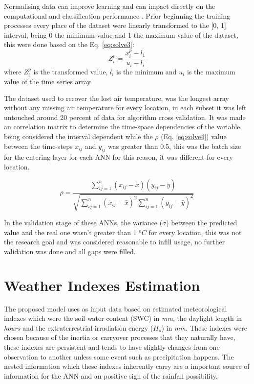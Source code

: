 Normalising data can improve learning and can impact directly on the computational and classification performance \cite{shanker1996effect}. Prior beginning the training processes every place of the dataset were linearly transformed to the [0, 1] interval, being 0 the minimum value and 1 the maximum value of the dataset, this were done based on the Eq. \ref{eq:solve3}:
\begin{equation}
\label{eq:solve3}
Z_i^p = \frac{x_i^p - l_1}{u_i -l_i}
\end{equation}
where $Z_i^p$ is the transformed value, $l_i$ is the minimum and $u_i$ is the maximum value of the time series array. 

The dataset used to recover the lost air temperature, was the longest array without any missing air temperature for every location, in each subset it was left 
untouched around 20 percent of data for algorithm cross validation. It was made an correlation matrix to determine the time-space dependencies of the variable, being 
considered the interval dependent while the $\rho$ (Eq. \ref{eq:solve4}) value between the time-steps $x_{ij}$ and $y_{ij}$ was greater than 0.5, this was the
batch size for the entering layer for each ANN for this reason, it was different for every location.

\begin{equation}
\label{eq:solve4}
\rho = \frac{ \sum\limits_{ij=1}^n (x_{ij} - \bar{x})(y_{ij} - \bar{y})}{\sqrt{ \sum\limits_{ij=1}^n (x_{ij} - \bar{x})^2 \sum\limits_{ij=1}^n (y_{ij} - \bar{y})^2}}
\end{equation}

In the validation stage of these ANNs, the variance ($\sigma$) between the predicted value and the real one wasn't greater than 1 $^oC$ for every location, this was not the research goal and was considered reasonable to infill usage, no further validation was done and all gaps were filled.

\section{Weather Indexes Estimation}
\label{sec:linux}

The proposed model uses as input data based on estimated meteorological indexes which were the soil water content (SWC) in \textit{mm}, the daylight length in \textit{hours} and the extraterrestrial irradiation energy ($H_o$) in \textit{mm}. These indexes were chosen because of the inertia or carryover processes that they naturally have, these indexes are persistent and tends to have slightly changes from one observation to another unless some event such as precipitation happens. The nested information which these indexes inherently carry are a important source of information for the ANN and an positive sign of the rainfall possibility.

